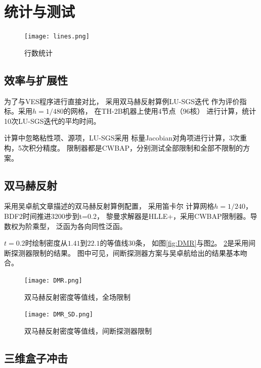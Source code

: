 \documentclass[UTF8,zihao=5]{ctexart} %
\begin{document}
\section{统计与测试}

\begin{figure}[htbp]
    \centering
    \texttt{[image: lines.png]}  %
    \caption{行数统计
        }
    \label{fig:lines}
\end{figure}

\subsection{效率与扩展性}
为了与VES程序进行直接对比，
采用双马赫反射算例LU-SGS迭代
作为评价指标。采用$h=1/480$的网格，
在TH-2B机器上使用4节点（96核）
进行计算，统计10次LU-SGS迭代的平均时间。

计算中忽略粘性项、源项，LU-SGS采用
标量Jacobian对角项进行计算，3次重构，5次积分精度。
限制器都是CWBAP，分别测试全部限制和全部不限制的方案。

\subsection{双马赫反射}

采用吴卓航文章描述的双马赫反射算例配置，
采用笛卡尔
计算网格$h=1/240$，BDF2时间推进3200步到t=0.2，
黎曼求解器是HLLE+，采用CWBAP限制器。导数权为阶乘型，
泛函为各向同性泛函。

$t=0.2$时绘制密度从$1.41$到$22.1$的等值线30条，
如图\ref{fig:DMR}与图\ref{fig:DMR_SD}。
\ref{fig:DMR_SD}是采用间断探测器限制的结果。
图中可见，间断探测器方案与吴卓航给出的结果基本吻合。

\begin{figure}[H]
    \begin{minipage}[c]{0.45\linewidth}  %
        \centering
        \texttt{[image: DMR.png]}
        \caption{双马赫反射密度等值线，全场限制}
        \label{fig:DMR}
    \end{minipage}
    \hfill %
    \begin{minipage}[c]{0.45\linewidth}  %
        \centering
        \texttt{[image: DMR\_SD.png]}
        \caption{双马赫反射密度等值线，间断探测器限制}
        \label{fig:DMR_SD}
    \end{minipage}
\end{figure}



\subsection{三维盒子冲击}
\end{document}
